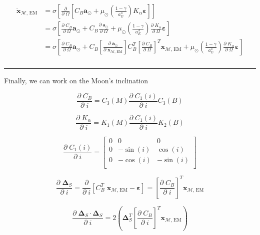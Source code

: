 \documentclass[]{article}
\newcommand{\pd}[2]{\frac{\partial\;#1}{\partial\;#2}}
\newcommand{\pddown}[2]{\frac{\partial}{\partial\;#2} \left[ #1 \right] }
\begin{document}
	\begin{align}
	\begin{split}
		\ddot{\mathbf{x}}_{\mathcal{M}\text{, EM}} 
		&= \sigma \left[ \pddown{C_B  \mathbf{a}_{\odot} + \mu_\odot \left(\frac{1-\gamma}{a_E^3}\right) K_\alpha \boldsymbol{\varepsilon}}{\Omega} \right] \\
		&= \sigma \left[ \pd{C_B}{\Omega}  \mathbf{a}_{\odot} + C_B  \pd{\mathbf{a}_{\odot}}{\Omega} + \mu_\odot \left(\frac{1-\gamma}{a_E^3}\right) \pd{K_\alpha}{\Omega} \boldsymbol{\varepsilon} \right] \\
		&= \sigma \left[ \pd{C_B}{\Omega}  \mathbf{a}_{\odot} + C_B  \left[\pd{\mathbf{a}_{\odot}}{ \mathbf{x}_{\mathcal{M}\text{, EM}} }\right] C_B^T \left[ \pd{C_B}{\Omega} \right]^T \mathbf{x}_{\mathcal{M}\text{, EM}} + \mu_\odot \left(\frac{1-\gamma}{a_E^3}\right) \pd{K_\alpha}{\Omega} \boldsymbol{\varepsilon} \right] \\
	\end{split}
	\end{align}
	
	\hrule \vspace{1em}
	
	Finally, we can work on the Moon's inclination
	
	\begin{equation*}
		\pd{C_B}{i} = C_3(M) \pd{C_1(i)}{i} C_3(B)
	\end{equation*}
	
	\begin{equation*}
		\pd{K_\alpha}{i} = K_1(M) \pd{C_1(i)}{i} K_2(B)
	\end{equation*}
	
	\begin{equation*}
		\pd{C_1(i)}{i} = \begin{bmatrix}
			0 & 0 & 0 \\
			0 & -\sin{(i)} & \cos{(i)} \\
			0 & -\cos{(i)} & -\sin{(i)} \\
		\end{bmatrix}
	\end{equation*}
	
	\begin{equation*}
		\pd{\boldsymbol{\Delta}_S}{i} = \pddown{C_B^T \; \mathbf{x}_{\mathcal{M}\text{, EM}} - \boldsymbol{\varepsilon}}{i} = \left[ \pd{C_B}{i} \right]^T \mathbf{x}_{\mathcal{M}\text{, EM}}
	\end{equation*}
	
	\begin{equation*}
		\pd{\boldsymbol{\Delta}_S \cdot \boldsymbol{\Delta}_S}{i} = 2\left( \boldsymbol{\Delta}_S^T \left[ \pd{C_B}{i} \right]^T \mathbf{x}_{\mathcal{M}\text{, EM}} \right)
	\end{equation*}
	
\end{document}
